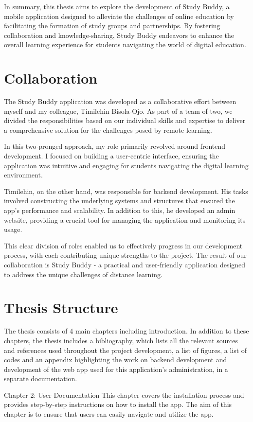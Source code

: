 In summary, this thesis aims to explore the development of Study Buddy, a mobile application designed to alleviate the challenges of online education by facilitating the formation of study groups and partnerships. By fostering collaboration and knowledge-sharing, Study Buddy endeavors to enhance the overall learning experience for students navigating the world of digital education.
\section{Collaboration}
The Study Buddy application was developed as a collaborative effort between myself and my colleague, Timilehin Bisola-Ojo. As part of a team of two, we divided the responsibilities based on our individual skills and expertise to deliver a comprehensive solution for the challenges posed by remote learning.

In this two-pronged approach, my role primarily revolved around frontend development. I focused on building a user-centric interface, ensuring the application was intuitive and engaging for students navigating the digital learning environment.

Timilehin, on the other hand, was responsible for backend development. His tasks involved constructing the underlying systems and structures that ensured the app's performance and scalability. In addition to this, he developed an admin website, providing a crucial tool for managing the application and monitoring its usage.

This clear division of roles enabled us to effectively progress in our development process, with each contributing unique strengths to the project. The result of our collaboration is Study Buddy - a practical and user-friendly application designed to address the unique challenges of distance learning.
\section{Thesis Structure}
The thesis consists of 4 main chapters including introduction. In addition to these chapters, the thesis includes a bibliography, which lists all the relevant sources and references used throughout the project development, a list of figures, a list of codes and an appendix  highlighting the work on backend development and development of the web app used for this application's administration, in a separate documentation.

Chapter 2: User Documentation \newline
This chapter covers the installation process and provides step-by-step instructions on how to install the app. The aim of this chapter is to ensure that users can easily navigate and utilize the app.

